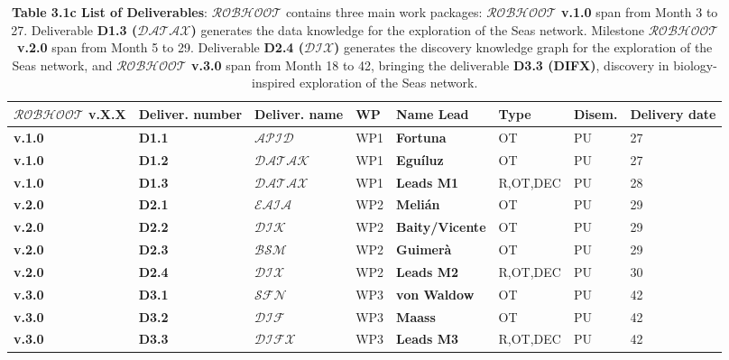 \documentclass[11pt, a4paper]{article} %
\begin{document}
\begin{table}[h!]
\begin{center}
  \begin{tabular}{|m{2cm} || m{1.25cm} || m{1.75cm} || m{1.55cm} || m{2.4cm} || m{1.7cm} || m{1.15cm} || m{1.7cm}|}
  \hline\hline
  \rowcolor{lightpink!30}
  {\bf $\mathcal{ROBHOOT}$ v.X.X} & {\bf Deliver. number} & {\bf Deliver. name} & {\bf WP} & {\bf Name Lead} & {\bf Type} & {\bf Disem.} & {\bf Delivery date} \\
  \hline\hline
  \rowcolor{piggypink!20}
  {\bf v.1.0} & {\bf D1.1} & $\mathcal{APID}$ & WP1 & {\bf Fortuna} & OT & PU & 27 \\
  \hline\hline
  \rowcolor{piggypink!20}
  {\bf v.1.0} & {\bf D1.2} & $\mathcal{DATAK}$ & WP1 & {\bf Egu\'iluz} & OT & PU  & 27 \\
  \hline\hline
  \rowcolor{piggypink!20}
  {\bf v.1.0} & {\bf D1.3} & $\mathcal{DATAX}$ & WP1 & {\bf Leads M1} & R,OT,DEC & PU  & 28 \\
    \hline\hline
 \rowcolor{piggypink!40}
  {\bf v.2.0} & {\bf D2.1} & $\mathcal{EAIA}$ & WP2 & {\bf Meli\'an} & OT & PU & 29 \\
  \hline\hline
  \rowcolor{piggypink!40}
  {\bf v.2.0} & {\bf D2.2} & $\mathcal{DIK}$ & WP2 & {\bf Baity/Vicente} & OT & PU  & 29 \\
  \hline\hline
   \rowcolor{piggypink!40}
  {\bf v.2.0} & {\bf D2.3} & $\mathcal{BSM}$ & WP2 & {\bf Guimer\`a} & OT & PU  & 29 \\
  \hline\hline
  \rowcolor{piggypink!40}
    {\bf v.2.0} & {\bf D2.4} & $\mathcal{DIX}$ & WP2 & {\bf Leads M2} & R,OT,DEC & PU & 30 \\
    \hline\hline
   \rowcolor{piggypink!60}
  {\bf v.3.0} & {\bf D3.1} & $\mathcal{SFN}$ & WP3 & {\bf von Waldow} & OT & PU & 42 \\
  \hline\hline
   \rowcolor{piggypink!80}
  {\bf v.3.0} & {\bf D3.2} & $\mathcal{DIF}$ & WP3 & {\bf Maass} & OT & PU & 42 \\
  \hline\hline
  \rowcolor{piggypink!80}
  {\bf v.3.0} & {\bf D3.3} & $\mathcal{DIFX}$ & WP3 & {\bf Leads M3} & R,OT,DEC & PU & 42 \\
\hline\hline
  \end{tabular}
\end{center}
\caption*{{{\bf Table 3.1c List of Deliverables}: {\bf
      $\mathcal{ROBHOOT}$} contains three main work packages: {\bf
      $\mathcal{ROBHOOT}$ v.1.0} span from Month 3 to 27. Deliverable
    {\bf D1.3 ($\mathcal{DATAX}$)} generates the data knowledge for
    the exploration of the Seas network. Milestone {\bf
      $\mathcal{ROBHOOT}$ v.2.0} span from Month 5 to 29. Deliverable
    {\bf D2.4 ($\mathcal{DIX}$)} generates the discovery knowledge
    graph for the exploration of the Seas network, and {\bf
      $\mathcal{ROBHOOT}$ v.3.0} span from Month 18 to 42, bringing
    the deliverable {\bf D3.3 (DIFX)}, discovery in biology-inspired
    exploration of the Seas network.}}
\end{table}
\end{document}

